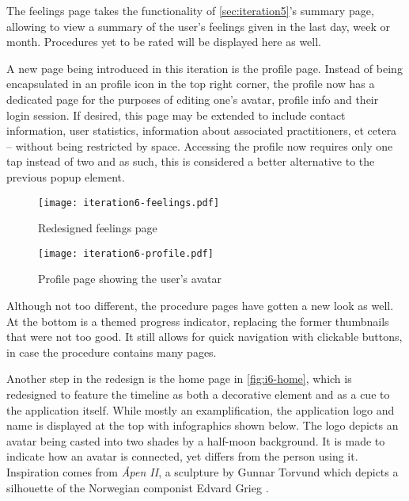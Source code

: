 The feelings page takes the functionality of \autoref{sec:iteration5}'s summary page, allowing to view a summary of the user's feelings given in the last day, week or month. Procedures yet to be rated will be displayed here as well.

A new page being introduced in this iteration is the profile page. Instead of being encapsulated in an profile icon in the top right corner, the profile now has a dedicated page for the purposes of editing one's avatar, profile info and their login session. If desired, this page may be extended to include contact information, user statistics, information about associated practitioners, et cetera -- without being restricted by space. Accessing the profile now requires only one tap instead of two and as such, this is considered a better alternative to the previous popup element.

\begin{figure}
    \centering
    \begin{minipage}[t]{0.4\textwidth}
        \centering
        \vspace{0pt}
        \texttt{[image: iteration6-feelings.pdf]}
        \caption{Redesigned feelings page}
        \label{fig:i6-feelings}
    \end{minipage}
    \hspace{0.05\textwidth}
    \begin{minipage}[t]{0.4\textwidth}
        \centering
        \vspace{0pt}
        \texttt{[image: iteration6-profile.pdf]}
        \caption{Profile page showing the user's avatar}
        \label{fig:i6-profile}
    \end{minipage}
\end{figure}

Although not too different, the procedure pages have gotten a new look as well. At the bottom is a themed progress indicator, replacing the former thumbnails that were not too good. It still allows for quick navigation with clickable buttons, in case the procedure contains many pages.

Another step in the redesign is the home page in \autoref{fig:i6-home}, which is redesigned to feature the timeline as both a decorative element and as a cue to the application itself. While mostly an examplification, the application logo and name is displayed at the top with infographics shown below. The logo depicts an avatar being casted into two shades by a half-moon background. It is made to indicate how an avatar is connected, yet differs from the person using it. Inspiration comes from \emph{Åpen II}, a sculpture by Gunnar Torvund which depicts a silhouette of the Norwegian componist Edvard Grieg \parencite{vaage2014}.

